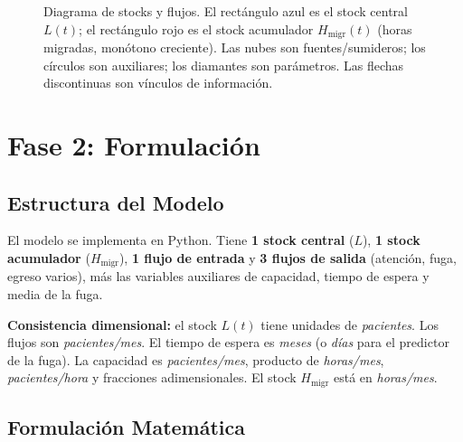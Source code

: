 \documentclass[12pt,a4paper]{article}
\begin{document}
\begin{figure}[H]
  \caption{Diagrama de stocks y flujos. El rectángulo azul es el stock central $L(t)$;
    el rectángulo rojo es el stock acumulador $H_{\text{migr}}(t)$ (horas migradas,
    monótono creciente). Las nubes son fuentes/sumideros; los círculos son auxiliares;
    los diamantes son parámetros. Las flechas discontinuas son vínculos de información.}
  \label{fig:stocks}
\end{figure}

\section{Fase 2: Formulación}

\subsection{Estructura del Modelo}

El modelo se implementa en Python. Tiene \textbf{1 stock central} ($L$), \textbf{1 stock acumulador} ($H_{\text{migr}}$), \textbf{1 flujo de entrada} y \textbf{3 flujos de salida} (atención, fuga, egreso varios), más las variables auxiliares de capacidad, tiempo de espera y media de la fuga.

\begin{definicion}
  \textbf{Consistencia dimensional:} el stock $L(t)$ tiene unidades de \textit{pacientes}. Los flujos son \textit{pacientes/mes}. El tiempo de espera es \textit{meses} (o \textit{días} para el predictor de la fuga). La capacidad es \textit{pacientes/mes}, producto de \textit{horas/mes}, \textit{pacientes/hora} y fracciones adimensionales. El stock $H_{\text{migr}}$ está en \textit{horas/mes}.
\end{definicion}

\subsection{Formulación Matemática}
\end{document}
